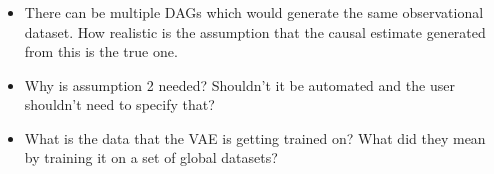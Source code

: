 \documentclass{beamer}
\begin{document}
\begin{frame}
	\frametitle{}
	\begin{itemize}
		\item There can be multiple DAGs which would generate the same observational dataset. How realistic is the assumption that the causal estimate generated from this is the true one.
		\item Why is assumption 2 needed? Shouldn't it be automated and the user shouldn't need to specify that?
		\item What is the data that the VAE is getting trained on? What did they mean by training it on a set of global datasets?
	\end{itemize}
\end{frame}
\end{document}
